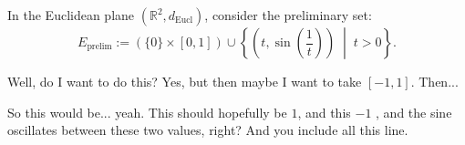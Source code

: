 \begin{content}
In the Euclidean plane $(\mathbb{R}^2, d_{\text{Eucl}})$, consider the preliminary set:
\[
E_{\text{prelim}} := \left( \{0\} \times [0, 1] \right) \cup \left\{ \left( t, \sin\left(\frac{1}{t}\right)\right) \;\middle|\; t > 0 \right\}.
\]
\end{content}

\begin{speech}[00:46:41 - 00:47:25]
Well, do I want to do this? Yes, but then maybe I want to take $[-1, 1]$. Then... 

So this would be... yeah. This should hopefully be $1$, and this $-1$ , and the sine oscillates between these two values, right? And you include all this line.
\end{speech}

\begin{hidden}
\end{hidden}

